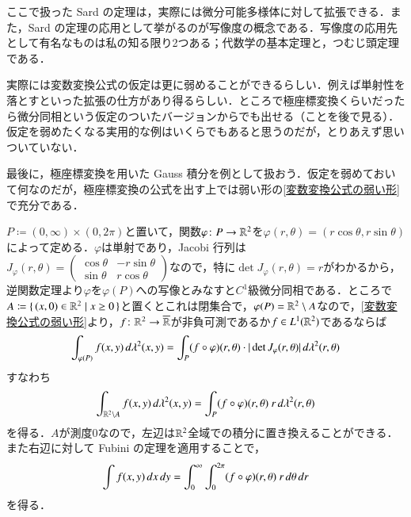\begin{que}[**]
ここで扱った Sard の定理は，実際には微分可能多様体に対して拡張できる．また，Sard の定理の応用として挙がるのが写像度の概念である．写像度の応用先として有名なものは私の知る限り2つある；代数学の基本定理と，つむじ頭定理である．
\end{que}

\begin{que}[*]
実際には変数変換公式の仮定は更に弱めることができるらしい．例えば単射性を落とすといった拡張の仕方があり得るらしい．ところで極座標変換くらいだったら微分同相という仮定のついたバージョンからでも出せる（ことを後で見る）．仮定を弱めたくなる実用的な例はいくらでもあると思うのだが，とりあえず思いついていない．
\end{que}

最後に，極座標変換を用いた Gauss 積分を例として扱おう．仮定を弱めておいて何なのだが，極座標変換の公式を出す上では弱い形の\cref{変数変換公式の弱い形}で充分である．

\begin{exm}[極座標変換]$P \coloneqq (0, \infty) \times (0,2\pi)$と置いて，関数$\varphi \colon P \to \mathbb{R}^2$を$\varphi(r,\theta) = (r \cos \theta, r \sin \theta)$によって定める．$\varphi$は単射であり，Jacobi 行列は$
J_{\varphi}(r,\theta) =
    \begin{pmatrix}
    \cos \theta & -r \sin \theta \\
    \sin \theta & r \cos \theta
    \end{pmatrix}
$なので，特に$\det J_\varphi(r,\theta) = r$がわかるから，逆関数定理より$\varphi$を$\varphi(P)$への写像とみなすと$C^1$級微分同相である．ところで$A \coloneqq \set{(x,0) \in \mathbb{R}^2 | x \geq 0}$と置くとこれは閉集合で，$\varphi(P) = \mathbb{R}^2 \setminus A$なので，\cref{変数変換公式の弱い形}より，$f \colon \mathbb{R}^2 \to \overline{\mathbb{R}}$が非負可測であるか$f \in L^1(\mathbb{R}^2)$であるならば
\begin{equation}
\int_{\varphi(P)} f(x,y) \mathop{}\!d \lambda^2(x,y) = \int_P (f \circ \varphi) (r, \theta) \cdot |\det J_\varphi (r,\theta)| \mathop{}\!d\lambda^2(r,\theta)
\end{equation}すなわち
\begin{equation}
\int_{\mathbb{R}^2 \setminus A} f(x,y) \mathop{}\!d \lambda^2(x,y) = \int_P (f \circ \varphi) (r, \theta) \ r \mathop{}\!d\lambda^2(r,\theta)
\end{equation}を得る．$A$が測度0なので，左辺は$\mathbb{R}^2$全域での積分に置き換えることができる．また右辺に対して Fubini の定理を適用することで，
\begin{equation}
\int f(x,y) \mathop{}\!d x \mathop{}\!d y = \int_0^\infty \int_0^{2\pi} (f \circ \varphi) (r, \theta) \ r\mathop{}\!d\theta \mathop{}\!d r
\end{equation}を得る．
\end{exm}

